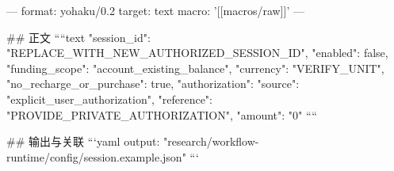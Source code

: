 ---
format: yohaku/0.2
target: text
macro: '[[macros/raw]]'
---

## 正文
````text
{
  "session_id": "REPLACE_WITH_NEW_AUTHORIZED_SESSION_ID",
  "enabled": false,
  "funding_scope": "account_existing_balance",
  "currency": "VERIFY_UNIT",
  "no_recharge_or_purchase": true,
  "authorization": {
    "source": "explicit_user_authorization",
    "reference": "PROVIDE_PRIVATE_AUTHORIZATION",
    "amount": "0"
  }
}
````

## 输出与关联
```yaml
output: "research/workflow-runtime/config/session.example.json"
```
